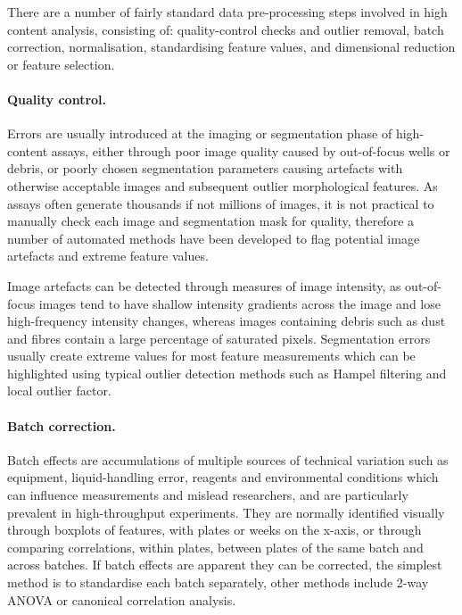 \documentclass[a4paper,11pt,twoside,openright]{scrbook}
\begin{document}
There are a number of fairly standard data pre-processing steps involved in high content analysis, consisting of: quality-control checks and outlier removal, batch correction, normalisation, standardising feature values, and dimensional reduction or feature selection. \cite{Caicedo2017}


\paragraph{Quality control.}
Errors are usually introduced at the imaging or segmentation phase of high-content assays, either through poor image quality caused by out-of-focus wells or debris, or poorly chosen segmentation parameters causing artefacts with otherwise acceptable images and subsequent outlier morphological features.
As assays often generate thousands if not millions of images, it is not practical to manually check each image and segmentation mask for quality, therefore a number of automated methods have been developed to flag potential image artefacts and extreme feature values.

Image artefacts can be detected through measures of image intensity, as out-of-focus images tend to have shallow intensity gradients across the image and lose high-frequency intensity changes, \cite{Bray2012} whereas images containing debris such as dust and fibres contain a large percentage of saturated pixels.
Segmentation errors usually create extreme values for most feature measurements which can be highlighted using typical outlier detection methods such as Hampel filtering \cite{Hampel1974} and local outlier factor. \cite{Breunig2000}

\paragraph{Batch correction.}
Batch effects are accumulations of multiple sources of technical variation such as equipment, liquid-handling error, reagents and environmental conditions which can influence measurements and mislead researchers, and are particularly prevalent in high-throughput experiments.
They are normally identified visually through boxplots of features, with plates or weeks on the x-axis, or through comparing correlations, within plates, between plates of the same batch and across batches.
If batch effects are apparent they can be corrected, the simplest method is to standardise each batch separately, other methods include 2-way ANOVA \cite{Nygaard2016} or canonical correlation analysis. \cite{Vaisipour2014}
\end{document}
